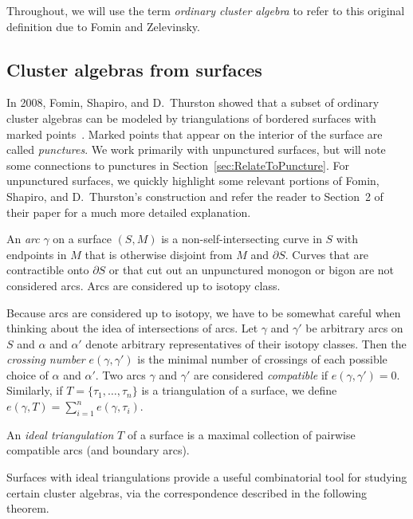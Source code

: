 Throughout, we will use the term \emph{ordinary cluster algebra} to refer to this original definition due to Fomin and Zelevinsky.

\subsection{Cluster algebras from surfaces}

In 2008, Fomin, Shapiro, and D.~Thurston showed that a subset of ordinary cluster algebras can be modeled by triangulations of bordered surfaces with marked points~\cite{FST-triangulatedSurfaces}. Marked points that appear on the interior of the surface are called \emph{punctures}. We work primarily with unpunctured surfaces, but will note some connections to punctures in Section~\ref{sec:RelateToPuncture}. For unpunctured surfaces, we quickly highlight some relevant portions of Fomin, Shapiro, and D.~Thurston's construction and refer the reader to Section~2 of their paper for a much more detailed explanation.

\begin{Definition}An \emph{arc} $\gamma$ on a surface $(S,M)$ is a non-self-intersecting curve in $S$ with endpoints in $M$ that is otherwise disjoint from $M$ and $\partial S$. Curves that are contractible onto $\partial S$ or that cut out an unpunctured monogon or bigon are not considered arcs. Arcs are considered up to isotopy class.
\end{Definition}

Because arcs are considered up to isotopy, we have to be somewhat careful when thinking about the idea of intersections of arcs. Let $\gamma$ and $\gamma'$ be arbitrary arcs on $S$ and $\alpha$ and $\alpha'$ denote arbitrary representatives of their isotopy classes. Then the \emph{crossing number} $e(\gamma,\gamma')$ is the minimal number of crossings of each possible choice of $\alpha$ and $\alpha'$. Two arcs $\gamma$ and $\gamma'$ are considered \emph{compatible} if $e(\gamma,\gamma') = 0.$ Similarly, if $T = \{\tau_1,\ldots,\tau_n\}$ is a triangulation of a surface, we define $e(\gamma,T) = \sum_{i=1}^n e(\gamma, \tau_i)$.

\begin{Definition}
An \emph{ideal triangulation} $T$ of a surface is a maximal collection of pairwise compatible arcs (and boundary arcs).
\end{Definition}

Surfaces with ideal triangulations provide a useful combinatorial tool for studying certain cluster algebras, via the correspondence described in the following theorem.

